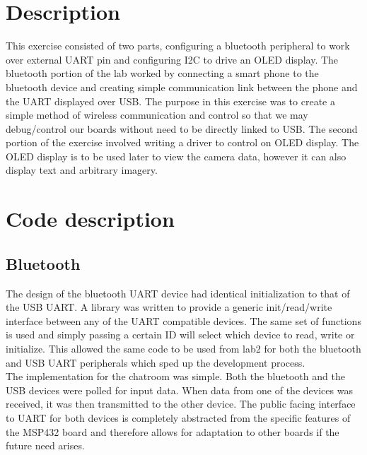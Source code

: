 \documentclass[CMPE]{../KGCOEReport}
\begin{document}
    \maketitle
    \section*{Description}

   	This exercise consisted of two parts, configuring a bluetooth peripheral to work over
   	external UART pin and configuring I2C to drive an OLED display. The bluetooth portion
   	of the lab worked by connecting a smart phone to the bluetooth device and creating
   	simple communication link between the phone and the UART displayed over USB. The
   	purpose in this exercise was to create a simple method of wireless communication and
   	control so that we may debug/control our boards without need to be directly linked to
   	USB. The second portion of the exercise involved writing a driver to control on OLED
   	display. The OLED display is to be used later to view the camera data, however it can
   	also display text and arbitrary imagery.

    \section*{Code description}
    \subsection*{Bluetooth}

    The design of the bluetooth UART device had identical initialization to that of
    the USB UART. A library was written to provide a generic init/read/write interface
    between any of the UART compatible devices. The same set of functions is used and
    simply passing a certain ID will select which device to read, write or initialize.
    This allowed the same code to be used from lab2 for both the bluetooth and USB UART
    peripherals which sped up the development process.\\

	The implementation for the chatroom was simple. Both the bluetooth and the USB devices
	were polled for input data. When data from one of the devices was received, it was
	then transmitted to the other device. The public facing interface to UART for
	both devices is completely abstracted from the specific features of the MSP432
	board and therefore allows for adaptation to other boards if the future need arises.
\end{document}
